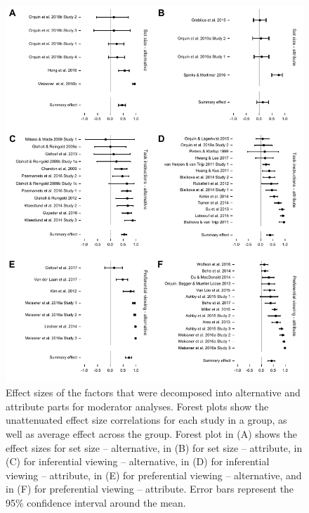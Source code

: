 \documentclass[english,natbib,man,floatsintext]{apa6}
\begin{document}
\begin{figure}%
\includegraphics{forest_plots_altatt}
\centering
\singlespace
\caption{Effect sizes of the factors that were decomposed into alternative and attribute parts for moderator analyses. Forest plots show the unattenuated effect size correlations for each study in a group, as well as average effect across the group. Forest plot in (A) shows the effect sizes for set size -- alternative, in (B) for set size -- attribute, in (C) for inferential viewing -- alternative, in (D) for inferential viewing -- attribute, in (E) for preferential viewing -- alternative, and in (F) for preferential viewing -- attribute. Error bars represent the 95\% confidence interval around the mean.}
\label{fig:forest_plots_altatt}
\end{figure}
\clearpage
\end{document}
